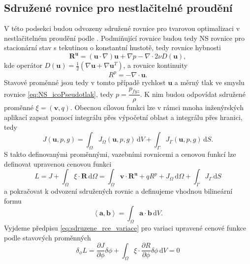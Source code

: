 \subsection{Sdružené rovnice pro nestlačitelné proudění}

V této podsekci budou odvozeny sdružené rovnice pro tvarovou optimalizaci v nestlačitelném proudění podle \cite{papadimitriou2007continuous, furst2020mko2}. Podmiňující rovnice budou tedy NS rovnice pro stacionární stav s tekutinou o konstantní hustotě, tedy rovnice hybnosti
\begin{equation}\label{eq:rce_hybnosti}
\mathbf{R^u}=\left(\mathbf{u}\cdot\nabla\right)\mathbf{u} + \nabla p - \nabla \cdot 2 \nu D(\mathbf{u}),
\end{equation}
kde operátor $ D(\mathbf{u})=\frac{1}{2}(\nabla\mathbf{u}+\nabla\mathbf{u}^T) $, a rovnice kontinuity
\begin{equation}
R^p=-\nabla \cdot \mathbf{u}.
\end{equation}\label{eq:rce_kontinuity}
Stavové proměnné jsou tedy v tomto případě rychlost $ \mathbf{u} $ a měrný tlak ve smyslu rovnice \ref{eq:NS_icoPseudotlak}, tedy $ p = \dfrac{p_{fyz}}{\rho}$. K nim budou odpovídat sdružené proměnné $ \xi = (\mathbf{v},q) $. Obecnou cílovou funkci lze v rámci mnoha inženýrských aplikací zapsat pomocí integrálu přes výpočetní oblast a integrálu přes hranici, tedy
\begin{equation}\label{eq:cenova_fce}
J(\mathbf{u},p,g)=\int_{\Omega} J_\Omega(\mathbf{u},p,g) \, \mathrm{d}V + \int_{\Gamma}J_\Gamma(\mathbf{u},p,g) \, \mathrm{d}S.
\end{equation}
S takto definovanými proměnnými, vazebními rovnicemi a cenovou funkcí lze definovat upravenou cenovou funkci
\begin{equation}
L= J + \int_\Omega \xi \cdot \mathbf{R} \,\mathrm{d}\Omega 
= \int_\Omega \mathbf{v}\cdot\mathbf{R^u}+ q R^p +J_\Omega  \,\mathrm{d}\Omega + \int_{\Gamma}J_\Gamma \, \mathrm{d}S
\end{equation}
a pokračovat k odvození sdružených rovnic a definujeme vhodnou bilineární formu 
\begin{equation}
\left\langle \mathbf{a},\mathbf{b} \right\rangle = \int_{\Omega} \mathbf{a} \cdot \mathbf{b} \, \mathrm{d}V.
\end{equation} 
Vyjdeme předpisu \ref{eq:sdruzene_rce_variace} pro variaci upravené cenové funkce podle stavových proměnných
\begin{equation} \label{eq:sdruzena_variace}
\delta_\phi L = 
\frac{\partial J}{\partial \phi}\delta\phi
+
\int_{\Omega} 
\xi \cdot \dfrac{\partial R}{\partial \phi}  \delta\phi 
\, \mathrm{d}V
 = 0
\end{equation}
